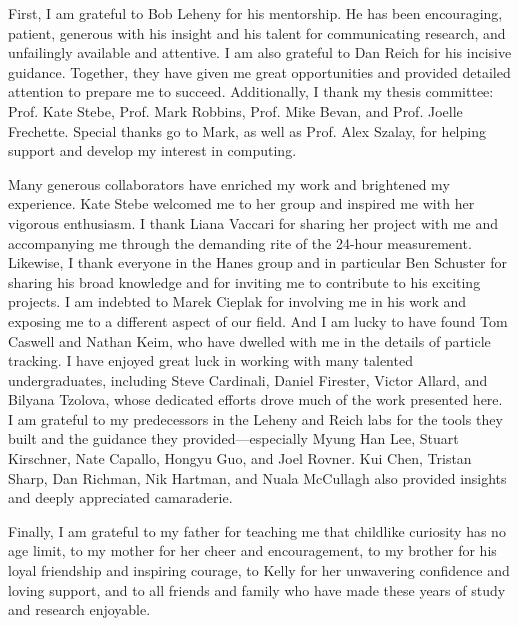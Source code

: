 \begin{frontmatter}
\begin{acknowledgment}

First, I am grateful to Bob Leheny for his mentorship. He has been encouraging, patient, generous with his insight and his talent for communicating research, and unfailingly available and attentive. I am also grateful to Dan Reich for his incisive guidance. Together, they have given me great opportunities and provided detailed attention to prepare me to succeed. Additionally, I thank my thesis committee: Prof. Kate Stebe, Prof. Mark Robbins, Prof. Mike Bevan, and Prof. Joelle Frechette. Special thanks go to Mark, as well as Prof. Alex Szalay, for helping support and develop my interest in computing.

Many generous collaborators have enriched my work and brightened my experience. Kate Stebe welcomed me to her group and inspired me with her vigorous enthusiasm. I thank Liana Vaccari for sharing her project with me and accompanying me through the demanding rite of the 24-hour measurement. Likewise, I thank everyone in the Hanes group and in particular Ben Schuster for sharing his broad knowledge and for inviting me to contribute to his exciting projects. I am indebted to Marek Cieplak for involving me in his work and exposing me to a different aspect of our field. And I am lucky to have found Tom Caswell and Nathan Keim, who have dwelled with me in the details of particle tracking. I have enjoyed great luck in working with many talented undergraduates, including Steve Cardinali, Daniel Firester, Victor Allard, and Bilyana Tzolova, whose dedicated efforts drove much of the work presented here. I am grateful to my predecessors in the Leheny and Reich labs for the tools they built and the guidance they provided---especially Myung Han Lee, Stuart Kirschner, Nate Capallo, Hongyu Guo, and Joel Rovner. Kui Chen, Tristan Sharp, Dan Richman, Nik Hartman, and Nuala McCullagh also provided insights and deeply appreciated camaraderie.

Finally, I am grateful to my father for teaching me that childlike curiosity has no age limit, to my mother for her cheer and encouragement, to my brother for his loyal friendship and inspiring courage, to Kelly for her unwavering confidence and loving support, and to all friends and family who have made these years of study and research enjoyable.

\end{acknowledgment}

\tableofcontents



\end{frontmatter}
